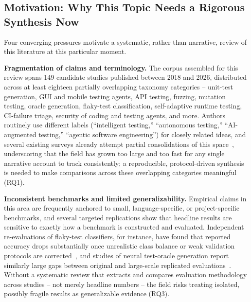 \subsection{Motivation: Why This Topic Needs a Rigorous Synthesis Now}
Four converging pressures motivate a systematic, rather than
narrative, review of this literature at this particular moment.

\textbf{Fragmentation of claims and terminology.} The corpus assembled
for this review spans 149 candidate studies published between 2018 and
2026, distributed across at least eighteen partially overlapping
taxonomy categories -- unit-test generation, GUI and mobile testing
agents, API testing, fuzzing, mutation testing, oracle generation,
flaky-test classification, self-adaptive runtime testing, CI-failure
triage, security of coding and testing agents, and more. Authors
routinely use different labels (``intelligent testing,'' ``autonomous
testing,'' ``AI-augmented testing,'' ``agentic software engineering'')
for closely related ideas, and several existing surveys already
attempt partial consolidations of this
space~\cite{slr0012024,slr0022024,slr0032023,slr0092024,slr0102024},
underscoring that the field has grown too large and too fast for any
single narrative account to track consistently; a reproducible,
protocol-driven synthesis is needed to make comparisons across these
overlapping categories meaningful (RQ1).

\textbf{Inconsistent benchmarks and limited generalizability.}
Empirical claims in this area are frequently anchored to small,
language-specific, or project-specific benchmarks, and several
targeted replications show that headline results are sensitive to
exactly how a benchmark is constructed and evaluated. Independent
re-evaluations of flaky-test classifiers, for instance, have found that
reported accuracy drops substantially once unrealistic class balance or
weak validation protocols are
corrected~\cite{alshammari2024flakyclassifiers,parry2023cannier}, and
studies of neural test-oracle generation report similarly large gaps
between original and large-scale replicated
evaluations~\cite{hossain2023}. Without a systematic review that
extracts and compares evaluation methodology across studies -- not
merely headline numbers -- the field risks treating isolated,
possibly fragile results as generalizable evidence (RQ3).

